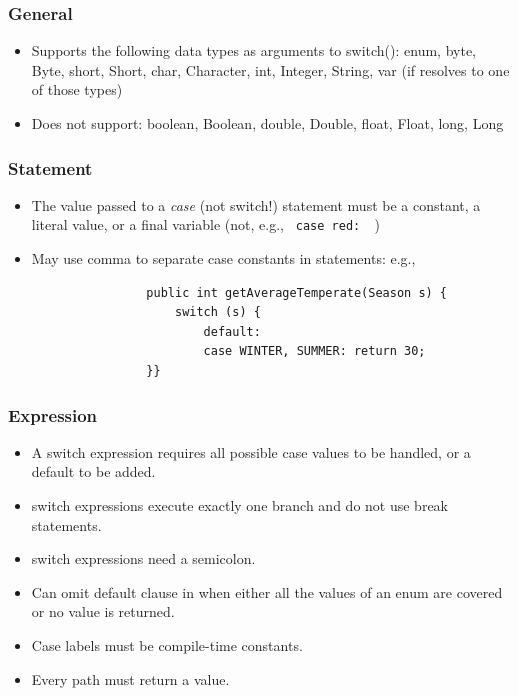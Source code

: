 \documentclass{scrartcl}
\begin{document}
\subsubsection{General}

        \begin{itemize}
            \item Supports the following data types as arguments to switch(): enum, byte, Byte, short, Short, char, Character, int, Integer,
            String, var (if resolves to one of those types)
            \item Does not support: boolean, Boolean, double, Double, float, Float, long, Long
         \end{itemize}

\subsubsection{Statement}

    \begin{itemize}
        \item The value passed to a \textit{case} (not switch!) statement must be a constant, a literal value, or a final variable (not, e.g., \lstinline$ case red:  $)
        \item May use comma to separate case constants in statements: e.g.,
            \begin{lstlisting}
                public int getAverageTemperate(Season s) {
                    switch (s) {
                        default:
                        case WINTER, SUMMER: return 30;
                }}
            \end{lstlisting}
    \end{itemize}

\subsubsection{Expression}

    \begin{itemize}
        \item A switch expression requires all possible case values to be handled, or a default to be added.
        \item switch expressions execute exactly one branch and do not use break statements.
        \item switch expressions need a semicolon.
        \item Can omit default clause in when either all the values of an enum are covered or no value is returned.
        \item Case labels must be compile-time constants.
        \item Every path must return a value.
    \end{itemize}
\end{document}
